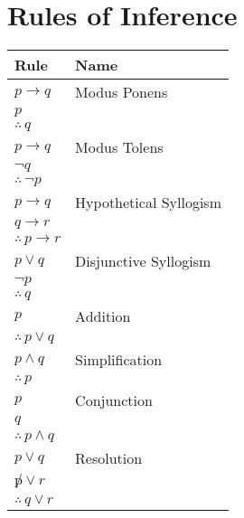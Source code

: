 \documentclass[11pt]{article}
\begin{document}
\section{Rules of Inference}
\label{sec:orgd968874}
\begin{center}
\begin{tabular}{ll}
\hline
Rule & Name\\
\hline
\(p \rightarrow q\) & Modus Ponens\\
\(p\) & \\
\hline
\(\therefore \, q\) & \\
\hline
\(p \rightarrow q\) & Modus Tolens\\
\(\lnot q\) & \\
\hline
\(\therefore \, \lnot p\) & \\
\hline
\(p \rightarrow q\) & Hypothetical Syllogism\\
\(q \rightarrow r\) & \\
\hline
\(\therefore \, p \rightarrow r\) & \\
\hline
\(p \lor q\) & Disjunctive Syllogism\\
\(\lnot p\) & \\
\hline
\(\therefore \, q\) & \\
\hline
\(p\) & Addition\\
\hline
\(\therefore \, p \lor q\) & \\
\hline
\(p \land q\) & Simplification\\
\hline
\(\therefore \, p\) & \\
\hline
\(p\) & Conjunction\\
\(q\) & \\
\hline
\(\therefore \, p \land q\) & \\
\hline
\(p \lor q\) & Resolution\\
\(\not p \lor r\) & \\
\hline
\(\therefore \, q \lor r\) & \\
\hline
\end{tabular}
\end{center}
\end{document}
